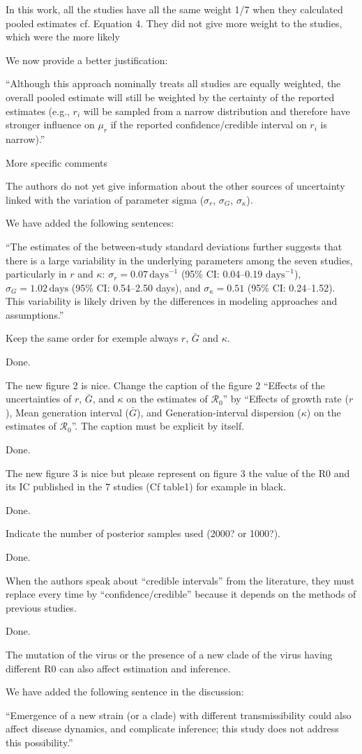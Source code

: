 \documentclass[12pt]{article}
\newcommand{\Ro}{\ensuremath{{\mathcal R}_{0}}\xspace}
\newcommand{\revtext}{\textsf}
\begin{document}
\revtext{In this work, all the studies have all the same weight 1/7 when they calculated pooled estimates
cf. Equation 4. They did not give more weight to the studies, which were the more likely}

We now provide a better justification:

``Although this approach nominally treats all studies are equally weighted, the overall pooled estimate will still be weighted by the certainty of the reported estimates (e.g., $r_i$ will be sampled from a narrow distribution and therefore have stronger influence on $\mu_r$ if the reported confidence/credible interval on $r_i$ is narrow).''

\revtext{More specific comments}

\revtext{The authors do not yet give information about the other sources of uncertainty linked
with the variation of parameter sigma ($\sigma_r$, $\sigma_G$, $\sigma_\kappa$).}

We have added the following sentences:

``The estimates of the between-study standard deviations further suggests that there is a large variability in the underlying parameters among the seven studies, particularly in $r$ and $\kappa$:
$\sigma_r = 0.07\,\textrm{days}^{-1}$ (95\% CI: 0.04--0.19 $\textrm{days}^{-1}$),
$\sigma_G = 1.02\,\textrm{days}$ (95\% CI: 0.54--2.50 days),
and
$\sigma_\kappa = 0.51$ (95\% CI: 0.24--1.52).
This variability is likely driven by the differences in modeling approaches and assumptions.''

\revtext{Keep the same order for exemple always $r$, $\bar G$ and $\kappa$.}

Done.

\revtext{
The new figure 2 is nice. Change the caption of the figure 2 “Effects of the uncertainties of $r$, $\bar G$, and $\kappa$ on the estimates of $\Ro$” by “Effects of growth rate ($r$), Mean generation interval ($\bar G$), and Generation-interval dispersion ($\kappa$) on the estimates of $\Ro$”. The caption must be explicit by itself.
}

Done.

\revtext{
The new figure 3 is nice but please represent on figure 3 the value of the R0
and its IC published in the 7 studies (Cf table1) for example in black.
}

Done.

\revtext{
Indicate the number of posterior samples used (2000? or 1000?).
}

Done.

\revtext{
When the authors speak about “credible intervals” from the literature, they must
replace every time by “confidence/credible” because it depends on the methods
of previous studies.
}

Done.

\revtext{
The mutation of the virus or the presence of a new clade of the virus having
different R0 can also affect estimation and inference.
}

We have added the following sentence in the discussion:

``Emergence of a new strain (or a clade) with different transmissibility could also affect disease dynamics, and complicate inference; this study does not address this possibility.''
\end{document}
